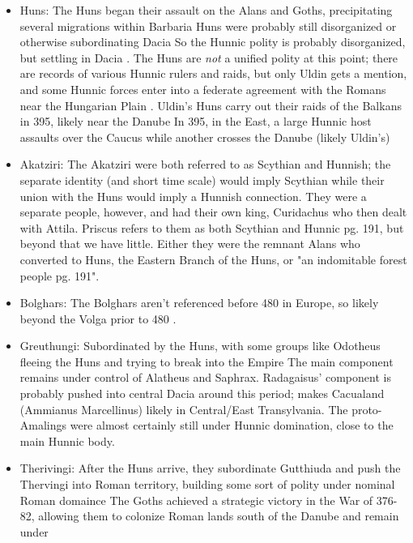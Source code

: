 \documentclass{article}
\begin{document}
	\begin{itemize}
		\item Huns:\newline
		The Huns began their assault on the Alans and Goths, precipitating several migrations within Barbaria
		Huns were probably still disorganized or otherwise subordinating Dacia
		So the Hunnic polity is probably disorganized, but settling in Dacia \cite{OttoHuns}.
		The Huns are \textit{not} a unified polity at this point; there are records of various Hunnic rulers and raids, but only Uldin gets a mention, and some Hunnic forces enter into a federate agreement with the Romans near the Hungarian Plain \cite{OttoHuns}.
		Uldin's Huns carry out their raids of the Balkans in 395, likely near the Danube
		In 395, in the East, a large Hunnic host assaults over the Caucus while another crosses the Danube (likely Uldin's)
		
		\item Akatziri:\newline
		The Akatziri were both referred to as Scythian and Hunnish; the separate identity (and short time scale) would imply Scythian while their union with the Huns would imply a Hunnish connection.
		They were a separate people, however, and had their own king, Curidachus \cite{PLRE_Vol2} who then dealt with Attila. 
		Priscus refers to them as both Scythian and Hunnic \cite{CambridgeHistoryEarlyInnerAsia}\tiny pg. 191\normalsize, but beyond that we have little.
		Either they were the remnant Alans who converted to Huns, the Eastern Branch of the Huns, or "an indomitable forest people \cite{CambridgeHistoryEarlyInnerAsia} \tiny pg. 191\normalsize".
		
		\item Bolghars:\newline
		The Bolghars aren't referenced before 480 in Europe, so likely beyond the Volga prior to 480 \cite{KimHuns}.
		
		\item Greuthungi:\newline
		Subordinated by the Huns, with some groups like Odotheus fleeing the Huns and trying to break into the Empire
		The main component remains under control of Alatheus and Saphrax.
		Radagaisus' component is probably pushed into central Dacia around this period; makes Cacualand (Ammianus Marcellinus) likely in Central/East Transylvania.
		The proto-Amalings were almost certainly still under Hunnic domination, close to the main Hunnic body.
		
		\item Therivingi:\newline
		After the Huns arrive, they subordinate Gutthiuda and push the Thervingi into Roman territory, building some sort of polity under nominal Roman domaince
		The Goths achieved a strategic victory in the War of 376-82, allowing them to colonize Roman lands south of the Danube and remain under \cite{HeatherEmpiresAndBarbarians}\newline
		

\end{itemize}
\end{document}
